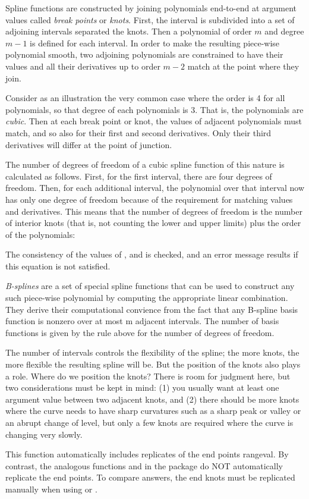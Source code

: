 \begin{Details}\relax
Spline functions are constructed by joining polynomials end-to-end at
argument values called \emph{break points} or \emph{knots}. First, the
interval is subdivided into a set of adjoining intervals
separated the knots.  Then a polynomial of order $m$ and
degree $m-1$ is defined for each interval.  In order to make the
resulting piece-wise polynomial smooth, two adjoining polynomials are
constrained to have their values and all their derivatives up to order
$m-2$ match at the point where they join.

Consider as an illustration the very common case where the order is 4
for all polynomials, so that degree of each polynomials is 3.  That
is, the polynomials are \emph{cubic}.  Then at each break point or
knot, the values of adjacent polynomials must match, and so also for
their first and second derivatives.  Only their third derivatives will
differ at the point of junction.

The number of degrees of freedom of a cubic spline function of this
nature is calculated as follows.  First, for the first interval, there
are four degrees of freedom.  Then, for each additional interval, the
polynomial over that interval now has only one degree of freedom
because of the requirement for matching values and derivatives.  This
means that the number of degrees of freedom is the number of interior
knots (that is, not counting the lower and upper limits) plus the
order of the polynomials:


The consistency of the values of ,  and
 is checked, and an error message results if this
equation is not satisfied.

\emph{B-splines} are a set of special spline functions that can be
used to construct any such piece-wise polynomial by computing the
appropriate linear combination.  They derive their computational
convience from the fact that any B-spline basis function is nonzero
over at most m adjacent intervals.  The number of basis functions is
given by the rule above for the number of degrees of freedom.

The number of intervals controls the flexibility of the spline;  the
more knots, the more flexible the resulting spline will be. But the
position of the knots also plays a role.  Where do we position the
knots?  There is room for judgment here, but two considerations must
be kept in mind:  (1) you usually want at least one argument value
between two adjacent knots, and (2)  there should be more knots where
the curve needs to have sharp curvatures such as a sharp peak or
valley or an abrupt change of level, but only a few knots are required
where the curve is changing very slowly.

This function automatically includes  replicates of the
end points rangeval.  By contrast, the analogous functions
 and  in the
 package do NOT automatically replicate the end points.
To compare answers, the end knots must be replicated manually when
using  or .
\end{Details}
